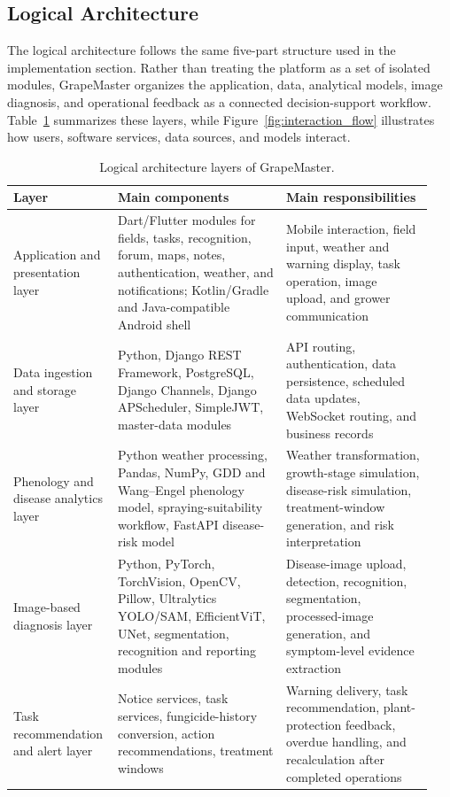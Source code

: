 \documentclass[11pt,a4paper]{article}
\begin{document}
\subsection{Logical Architecture}

The logical architecture follows the same five-part structure used in the implementation section. Rather than treating the platform as a set of isolated modules, GrapeMaster organizes the application, data, analytical models, image diagnosis, and operational feedback as a connected decision-support workflow. Table~\ref{tab:architecture_layers} summarizes these layers, while Figure~\ref{fig:interaction_flow} illustrates how users, software services, data sources, and models interact.

\begin{table}[H]
\centering
\caption{Logical architecture layers of GrapeMaster.}
\label{tab:architecture_layers}
\small
\begin{tabular}{@{}p{0.21\linewidth} p{0.39\linewidth} p{0.34\linewidth}@{}}
\toprule
Layer & Main components & Main responsibilities \\
\midrule
Application and presentation layer & Dart/Flutter modules for fields, tasks, recognition, forum, maps, notes, authentication, weather, and notifications; Kotlin/Gradle and Java-compatible Android shell & Mobile interaction, field input, weather and warning display, task operation, image upload, and grower communication \\
Data ingestion and storage layer & Python, Django REST Framework, PostgreSQL, Django Channels, Django APScheduler, SimpleJWT, master-data modules & API routing, authentication, data persistence, scheduled data updates, WebSocket routing, and business records \\
Phenology and disease analytics layer & Python weather processing, Pandas, NumPy, GDD and Wang--Engel phenology model, spraying-suitability workflow, FastAPI disease-risk model & Weather transformation, growth-stage simulation, disease-risk simulation, treatment-window generation, and risk interpretation \\
Image-based diagnosis layer & Python, PyTorch, TorchVision, OpenCV, Pillow, Ultralytics YOLO/SAM, EfficientViT, UNet, segmentation, recognition and reporting modules & Disease-image upload, detection, recognition, segmentation, processed-image generation, and symptom-level evidence extraction \\
Task recommendation and alert layer & Notice services, task services, fungicide-history conversion, action recommendations, treatment windows & Warning delivery, task recommendation, plant-protection feedback, overdue handling, and recalculation after completed operations \\
\bottomrule
\end{tabular}
\end{table}
\end{document}
